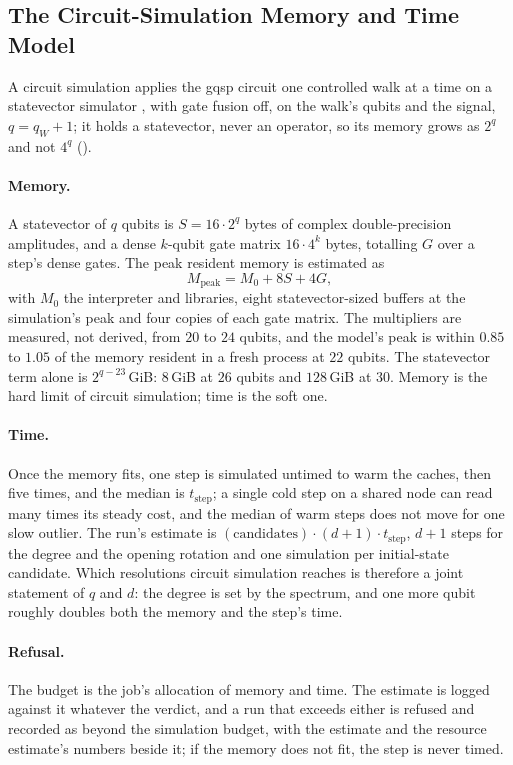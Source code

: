 \subsection{The Circuit-Simulation Memory and Time Model}
\label{app:t1-model}

A circuit simulation applies the \gls{gqsp} circuit one controlled walk at a time on a statevector simulator \cite{qiskit2024}, with gate fusion off, on the walk's qubits and the signal, $q=q_W+1$; it holds a statevector, never an operator, so its memory grows as $2^q$ and not $4^q$ ().

\paragraph{Memory.} A statevector of $q$ qubits is $S=16\cdot2^q$ bytes of complex double-precision amplitudes, and a dense $k$-qubit gate matrix $16\cdot4^k$ bytes, totalling $G$ over a step's dense gates. The peak resident memory is estimated as
\begin{equation*}
    M_{\mathrm{peak}}=M_0+8S+4G,
\end{equation*}
with $M_0$ the interpreter and libraries, eight statevector-sized buffers at the simulation's peak and four copies of each gate matrix. The multipliers are measured, not derived, from $20$ to $24$ qubits, and the model's peak is within $0.85$ to $1.05$ of the memory resident in a fresh process at $22$ qubits. The statevector term alone is $2^{q-23}$\,GiB: $8$\,GiB at $26$ qubits and $128$\,GiB at $30$. Memory is the hard limit of circuit simulation; time is the soft one.

\paragraph{Time.} Once the memory fits, one step is simulated untimed to warm the caches, then five times, and the median is $t_{\mathrm{step}}$; a single cold step on a shared node can read many times its steady cost, and the median of warm steps does not move for one slow outlier. The run's estimate is $(\text{candidates})\cdot(d+1)\cdot t_{\mathrm{step}}$, $d+1$ steps for the degree and the opening rotation and one simulation per initial-state candidate. Which resolutions circuit simulation reaches is therefore a joint statement of $q$ and $d$: the degree is set by the spectrum, and one more qubit roughly doubles both the memory and the step's time.

\paragraph{Refusal.} The budget is the job's allocation of memory and time. The estimate is logged against it whatever the verdict, and a run that exceeds either is refused and recorded as beyond the simulation budget, with the estimate and the resource estimate's numbers beside it; if the memory does not fit, the step is never timed.

